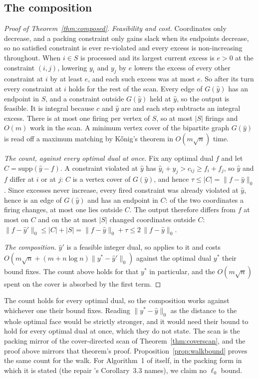 \subsection{The composition}

\begin{proof}[Proof of Theorem~\ref{thm:composed}]
\emph{Feasibility and cost.} Coordinates only decrease, and a packing constraint only gains slack
when its endpoints decrease, so no satisfied constraint is ever re-violated and every excess is
non-increasing throughout. When $i \in S$ is processed and its largest current excess is $e > 0$
at the constraint $(i,j)$, lowering $y_i$ and $y_j$ by $e$ lowers the excess of every other
constraint at $i$ by at least $e$, and each such excess was at most $e$. So after its turn every
constraint at $i$ holds for the rest of the scan. Every edge of $G(\hat y)$ has an endpoint in $S$, and
a constraint outside $G(\hat y)$ held at $\hat y$, so the output is feasible. It is integral
because $c$ and $\hat y$ are and each step subtracts an integral excess. There is at most one
firing per vertex of $S$, so at most $|S|$ firings and $O(m)$ work in the scan. A minimum vertex
cover of the bipartite graph $G(\hat y)$ is read off a maximum matching by K\H{o}nig's theorem in
$O(m\sqrt{n})$ time.

\emph{The count, against every optimal dual at once.} Fix any optimal dual $f$ and let
$C = \mathrm{supp}(\hat y - f)$. A constraint violated at $\hat y$ has
$\hat y_i + \hat y_j > c_{ij} \ge f_i + f_j$, so $\hat y$ and $f$ differ at $i$ or at $j$: $C$ is
a vertex cover of $G(\hat y)$, and hence $\tau \le |C| = \|f - \hat y\|_0$. Since excesses never
increase, every fired constraint was already violated at $\hat y$, hence is an edge of
$G(\hat y)$ and has an endpoint in $C$: of the two coordinates a firing changes, at most one lies
outside $C$. The output therefore differs from $f$ at most on $C$ and on the at most $|S|$ changed
coordinates outside $C$:
$\|f - \hat y'\|_0 \le |C| + |S| = \|f - \hat y\|_0 + \tau \le 2\,\|f - \hat y\|_0$.

\emph{The composition.} $\hat y'$ is a feasible integer dual, so \citet[Thm.~3.2]{chen2022}
applies to it and costs $O(m\sqrt{n} + (m + n\log n)\|y^* - \hat y'\|_0)$ against the optimal dual
$y^*$ their bound fixes. The count above holds for that $y^*$ in particular, and the $O(m\sqrt n)$
spent on the cover is absorbed by the first term.
\end{proof}

The count holds for every optimal dual, so the composition works against whichever one their
bound fixes. Reading $\|y^* - \hat y\|_0$ as the distance to the whole optimal face would be
strictly stronger, and it would need their bound to hold for every optimal dual at once, which
they do not state. The scan is the packing mirror of the cover-directed scan of
Theorem~\ref{thm:coverscan}, and the proof above mirrors that theorem's proof.
Proposition~\ref{prop:walkbound} proves the same count for the walk. For Algorithm~1 of
\citet{dinitz2021} itself, in the packing form in which it is stated (the repair
\citeauthor{chen2022}'s Corollary~3.3 names), we claim no $\ell_0$ bound.

